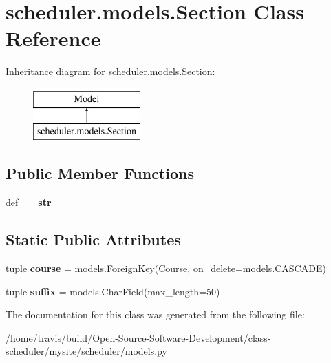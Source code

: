 \hypertarget{classscheduler_1_1models_1_1_section}{\section{scheduler.\-models.\-Section Class Reference}
\label{classscheduler_1_1models_1_1_section}
}
Inheritance diagram for scheduler.\-models.\-Section\-:\begin{figure}[H]
\begin{center}
\leavevmode
\includegraphics[height=2.000000cm]{classscheduler_1_1models_1_1_section}
\end{center}
\end{figure}
\subsection*{Public Member Functions}
\begin{DoxyCompactItemize}
\item 
\hypertarget{classscheduler_1_1models_1_1_section_a246a1f55dd3ce2f8b7e22b381535e09d}{def {\bfseries \-\_\-\-\_\-str\-\_\-\-\_\-}}\label{classscheduler_1_1models_1_1_section_a246a1f55dd3ce2f8b7e22b381535e09d}

\end{DoxyCompactItemize}
\subsection*{Static Public Attributes}
\begin{DoxyCompactItemize}
\item 
\hypertarget{classscheduler_1_1models_1_1_section_ac4fd835769f6add9617f8885b0d225fe}{tuple {\bfseries course} = models.\-Foreign\-Key(\hyperlink{classscheduler_1_1models_1_1_course}{Course}, on\-\_\-delete=models.\-C\-A\-S\-C\-A\-D\-E)}\label{classscheduler_1_1models_1_1_section_ac4fd835769f6add9617f8885b0d225fe}

\item 
\hypertarget{classscheduler_1_1models_1_1_section_a7cddf1d09f1567eb46674001375767b7}{tuple {\bfseries suffix} = models.\-Char\-Field(max\-\_\-length=50)}\label{classscheduler_1_1models_1_1_section_a7cddf1d09f1567eb46674001375767b7}

\end{DoxyCompactItemize}


The documentation for this class was generated from the following file\-:\begin{DoxyCompactItemize}
\item 
/home/travis/build/\-Open-\/\-Source-\/\-Software-\/\-Development/class-\/scheduler/mysite/scheduler/models.\-py\end{DoxyCompactItemize}

